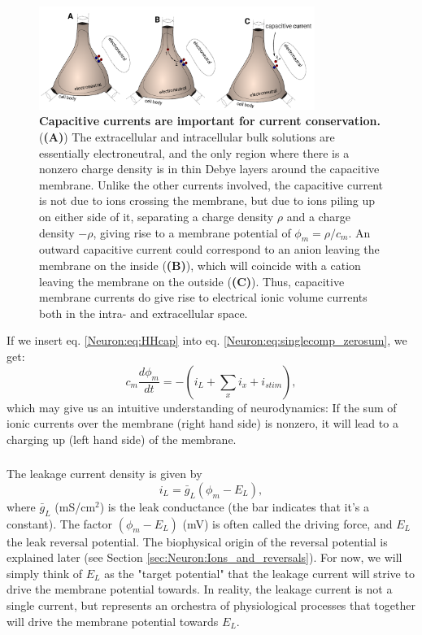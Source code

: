 \begin{figure}[!ht]
\begin{center}
\includegraphics[width=0.8\textwidth]{Figures/Neuron/capacitive_currents.pdf}
\end{center}
\caption{\textbf{Capacitive currents are important for current conservation.}  (\textbf{(A)}) The extracellular and intracellular bulk solutions are essentially electroneutral, and the only region where there is a nonzero charge density is in thin Debye layers around the capacitive membrane. Unlike the other currents involved, the capacitive current is not due to ions crossing the membrane, but due to ions piling up on either side of it, separating a charge density $\rho$ and a charge density $-\rho$, giving rise to a membrane potential of $\phi_m = \rho/c_m$. An outward capacitive current could correspond to an anion leaving the membrane on the inside (\textbf{(B)}), which will coincide with a cation leaving the membrane on the outside (\textbf{(C)}). Thus, capacitive membrane currents do give rise to electrical ionic volume currents both in the intra- and extracellular space.
}
\label{Neuron:fig:capacitive_currents}
\end{figure}

If we insert eq. \ref{Neuron:eq:HHcap} into eq. \ref{Neuron:eq:singlecomp_zerosum}, we get:
\begin{equation}
c_m \frac{d\phi_m}{dt} = - (i_L + \sum_x{i_x} +  i_{stim}),
\label{Neuron:eq:singlecomp_capinserted}
\end{equation}
which may give us an intuitive understanding of neurodynamics: If the sum of ionic currents over the membrane (right hand side) is nonzero, it will lead to a charging up (left hand side) of the membrane. 


\subsubsection{}
\label{sec:Neuron:leak}
The leakage current density is given by
\begin{equation}
i_L = \bar{g}_L (\phi_m - E_L),
\label{Neuron:eq:HHleak}
\end{equation}
where $\bar{g}_L$ (mS/cm$^2$) is the leak conductance (the bar indicates that it's a constant). The factor $(\phi_m - E_L)$ (mV) is often called the driving force, and $E_L$ the leak reversal potential. The biophysical origin of the reversal potential is explained later (see Section \ref{sec:Neuron:Ions_and_reversals}). For now, we will simply think of $E_L$ as the "target potential" that the leakage current will strive to drive the membrane potential towards. In reality, the leakage current is not a single current, but represents an orchestra of physiological processes that together will drive the membrane potential towards $E_L$. 


